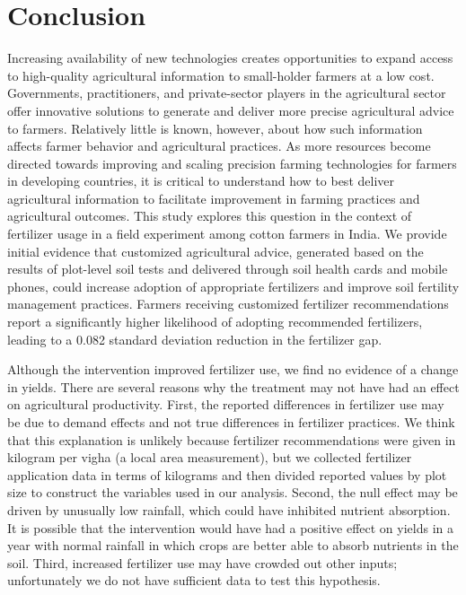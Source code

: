 \documentclass{article}
\begin{document}
\section{Conclusion}

Increasing availability of new technologies creates opportunities to expand access to high-quality agricultural information to small-holder farmers at a low cost. Governments, practitioners, and private-sector players in the agricultural sector offer innovative solutions to generate and deliver more precise agricultural advice to farmers. Relatively little is known, however, about how such information affects farmer behavior and agricultural practices. As more resources become directed towards improving and scaling precision farming technologies for farmers in developing countries, it is critical to understand how to best deliver agricultural information to facilitate improvement in farming practices and agricultural outcomes. This study explores this question in the context of fertilizer usage in a field experiment among cotton farmers in India. We provide initial evidence that customized agricultural advice, generated based on the results of plot-level soil tests and delivered through soil health cards and mobile phones, could increase adoption of appropriate fertilizers and improve soil fertility management practices. Farmers receiving customized fertilizer recommendations report a significantly higher likelihood of adopting recommended fertilizers, leading to a 0.082 standard deviation reduction in the fertilizer gap. 

Although the intervention improved fertilizer use, we find no evidence of a change in yields. There are several reasons why the treatment may not have had an effect on agricultural productivity. First, the reported differences in fertilizer use may be due to demand effects and not true differences in fertilizer practices. We think that this explanation is unlikely because fertilizer recommendations were given in kilogram per vigha (a local area measurement), but we collected fertilizer application data in terms of kilograms and then divided reported values by plot size to construct the variables used in our analysis. Second, the null effect may be driven by unusually low rainfall, which could have inhibited nutrient absorption. It is possible that the intervention would have had a positive effect on yields in a year with normal rainfall in which crops are better able to absorb nutrients in the soil. Third, increased fertilizer use may have crowded out other inputs; unfortunately we do not have sufficient data to test this hypothesis. 
\end{document}
